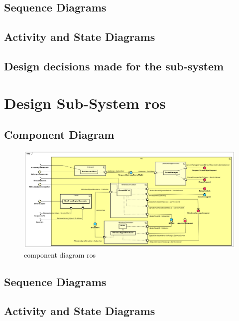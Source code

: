 \documentclass[a4paper, 11pt, oneside]{report}
\begin{document}
\subsection{Sequence Diagrams}
\label{DetailedDesign:MeshNetwerk:sequence}
\subsection{Activity and State Diagrams}
\label{DetailedDesign:MeshNetwerk:activity}
\subsection{Design decisions made for the sub-system}
\label{DetailedDesign:MeshNetwerk:decisions}

\section{Design Sub-System ros}
\label{DetailedDesign:WirelessSimulatie}
\subsection{Component Diagram}
\label{DetailedDesign:ros:ComponentDiagram}
\begin{figure}[H]
	\begin{center}\includegraphics[width=\linewidth]{Afbeeldingen/rosComponentDiagram.png}\end{center}
	\caption{component diagram ros}
	\label{fig:component:ros}
\end{figure}
\subsection{Sequence Diagrams}
\label{DetailedDesign:WirelessSimulatie:sequence}
\subsection{Activity and State Diagrams}
\label{DetailedDesign:WirelessSimulatie:activity}
\end{document}
